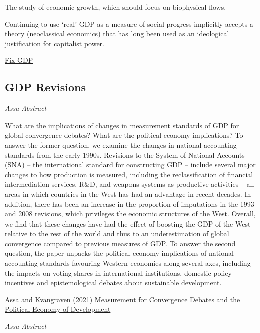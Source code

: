 \documentclass[
]{book}
\begin{document}
The study of economic growth, which should focus on biophysical flows.

Continuing to use `real' GDP as a measure of social progress implicitly accepts a theory
(neoclassical economics) that has long been used as an ideological justification for capitalist power.

\href{https://economicsfromthetopdown.com/2019/12/15/why-we-should-abandon-real-gdp-as-a-measure-of-economic-activity/}{Fix GDP}

\hypertarget{gdp-revisions}{%
\subsection{GDP Revisions}\label{gdp-revisions}}

\emph{Assa Abstract}

What are the implications of changes in measurement standards of GDP for global convergence debates? What are the political economy implications? To answer the former question, we examine the changes in national accounting standards from the early 1990s. Revisions to the System of National Accounts (SNA) -- the international standard for constructing GDP -- include several major changes to how production is measured, including the reclassification of financial intermediation services, R\&D, and weapons systems as productive activities -- all areas in which countries in the West has had an advantage in recent decades. In addition, there has been an increase in the proportion of imputations in the 1993 and 2008 revisions, which privileges the economic structures of the West. Overall, we find that these changes have had the effect of boosting the GDP of the West relative to the rest of the world and thus to an underestimation of global convergence compared to previous measures of GDP. To answer the second question, the paper unpacks the political economy implications of national accounting standards favouring Western economies along several axes, including the impacts on voting shares in international institutions, domestic policy incentives and epistemological debates about sustainable development.

\href{https://www.tandfonline.com/doi/abs/10.1080/13563467.2020.1865899?journalCode=cnpe20}{Assa and Kvangraven (2021) Measurement for Convergence Debates and the Political Economy of Development}

\emph{Assa Abstract}
\end{document}
